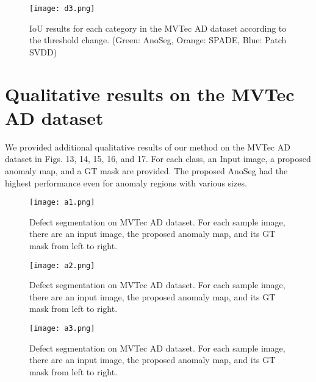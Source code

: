 \documentclass{article} \usepackage{iclr2022_conference,times}
\begin{document}
\begin{figure}[t]
\begin{center}
\texttt{[image: d3.png]} 
\end{center}

  \caption{IoU results for each category in the MVTec AD dataset according to the threshold change. (Green: AnoSeg, Orange: SPADE, Blue: Patch SVDD)}
\label{fig11}
\end{figure}




\section{Qualitative results on the MVTec AD dataset}

We provided additional qualitative results of our method on the MVTec AD dataset in Figs. 13, 14, 15, 16, and 17. For each class, an Input image, a proposed anomaly map, and a GT mask are provided. The proposed AnoSeg had the highest performance even for anomaly regions with various sizes.

\begin{figure}[t]
\begin{center}
\texttt{[image: a1.png]} 
\end{center}

  \caption{Defect segmentation on MVTec AD dataset. For each sample image, there are an input image, the proposed anomaly map, and its GT mask from left to right.}
\label{fig12}
\end{figure}

\begin{figure}[t]
\begin{center}
\texttt{[image: a2.png]} 
\end{center}

  \caption{Defect segmentation on MVTec AD dataset. For each sample image, there are an input image, the proposed anomaly map, and its GT mask from left to right.}
\label{fig13}
\end{figure}

\begin{figure}[t]
\begin{center}
\texttt{[image: a3.png]} 
\end{center}

  \caption{Defect segmentation on MVTec AD dataset. For each sample image, there are an input image, the proposed anomaly map, and its GT mask from left to right.}
\label{fig14}
\end{figure}
\end{document}
